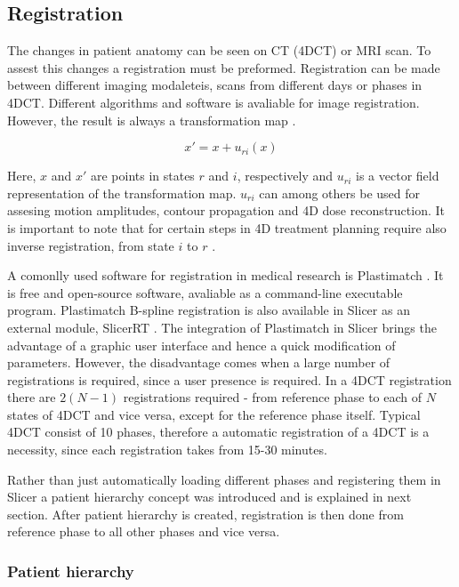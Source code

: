 \documentclass[type=dr, dr=rernat, accentcolor=tud7b,colorbacktitle, bigchapter, openright, twoside, 12pt ]{tudthesis}
\begin{document}
\subsection{Registration}

The changes in patient anatomy can be seen on CT (4DCT) or MRI scan. To assest this changes a registration must be preformed. Registration can be made between different imaging modaleteis, scans from different days or phases in 4DCT. Different algorithms and software is avaliable
for image registration. However, the result is always a transformation map \cite{Richter2012}. 

\begin{equation}
\label{df}
x' = x + u_{ri}(x)
\end{equation} 

Here, $x$ and $x'$ are points in states $r$ and $i$, respectively and $u_{ri}$ is a vector field representation of the transformation map. $u_{ri}$ can among others be used for assesing motion amplitudes, contour propagation and 4D dose reconstruction. It is important to note
that for certain steps in 4D treatment planning require also inverse registration, from state $i$ to $r$ \cite{Richter2012}.

A comonlly used software for registration in medical research is Plastimatch \cite{Shackleford2010}. It is free and open-source software, avaliable as a command-line executable program. Plastimatch B-spline registration is also available in Slicer as an external module, SlicerRT \cite{Pinter2012}.  
The integration of Plastimatch in Slicer brings the advantage of a graphic user interface and hence a quick modification of parameters. However, the disadvantage comes when a large number of registrations is required, since a user presence is required. In a 4DCT registration
there are $2(N-1)$ registrations required - from reference phase to each of $N$ states of 4DCT and vice versa, except for the reference phase itself. Typical 4DCT consist of 10 phases, therefore a automatic registration of a 4DCT is a necessity, since each registration takes from 15-30 minutes.

Rather than just automatically loading different phases and registering them in Slicer a patient hierarchy concept was introduced and is explained in next section. After patient hierarchy is created, registration is then done from reference phase to all other phases and vice versa. 

\subsubsection{Patient hierarchy} 
\end{document}
